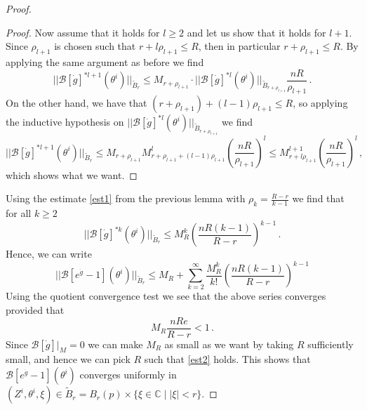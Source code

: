 \documentclass{article}
\theoremstyle{definition}
\numberwithin{equation}{section}
\begin{document}
\begin{proof}
\begin{proof}
    Now assume that it holds for $l \geq 2$ and let us show that it holds for $l+1$. Since $\rho_{l+1}$ is chosen such that $r+l\rho_{l+1}\leq R$, then in particular $r+\rho_{l+1}\leq R$. By applying the same argument as before we find 
    \begin{equation*}
        ||\mathcal{B}[\dot{g}]^{*l+1}(\theta^i)||_{\widetilde{B}_r}\leq M_{r+\rho_{l+1}}\cdot  ||\mathcal{B}[\dot{g}]^{*l}(\theta^i)||_{\widetilde{B}_{r+\rho_{l+1}}}\frac{nR}{\rho_{l+1}}\,.
    \end{equation*}
    On the other hand, we have that $(r+\rho_{l+1})+(l-1)\rho_{l+1}\leq R$, so applying the inductive hypothesis on $||\mathcal{B}[\dot{g}]^{*l}(\theta^i)||_{\widetilde{B}_{r+\rho_{l+1}}}$ we find
    \begin{equation*}
        ||\mathcal{B}[\dot{g}]^{*l+1}(\theta^i)||_{\widetilde{B}_r}\leq M_{r+\rho_{l+1}}M_{r+\rho_{l+1}+(l-1)\rho_{l+1}}^l\left(\frac{nR}{\rho_{l+1}}\right)^{l}\leq M_{r+l\rho_{l+1}}^{l+1}\left(\frac{nR}{\rho_{l+1}}\right)^{l}\,,
    \end{equation*}
    which shows what we want. 
    \end{proof}
    Using the estimate \eqref{est1} from the previous lemma with $\rho_k=\frac{R-r}{k-1}$ we find that for all $k\geq 2$
    \begin{equation*}
        ||\mathcal{B}[\dot{g}]^{*k}(\theta^i)||_{\widetilde{B}_{r}}\leq M_{R}^k \left(\frac{nR(k-1)}{R-r}\right)^{k-1}\,.
    \end{equation*}
    Hence, we can write
    \begin{equation*}
        ||\mathcal{B}[e^{\dot{g}}-1](\theta^i)||_{\widetilde{B}_r}\leq M_R+ \sum_{k=2}^{\infty}\frac{M_{R}^k }{k!}\left(\frac{nR(k-1)}{R-r}\right)^{k-1}
    \end{equation*}
    Using the quotient convergence test we see that the above series converges provided that 
    \begin{equation}\label{est2}
        M_R\frac{nRe}{R-r}<1\,.
    \end{equation}
    Since $\mathcal{B}[\dot{g}]|_M=0$ we can make $M_R$ as small as we want by taking $R$ sufficiently small, and hence we can pick $R$ such that \eqref{est2} holds. This shows that $\mathcal{B}[e^{\dot{g}}-1](\theta^i)$ converges uniformly in $(Z^i,\theta^i,\xi)\in \widetilde{B}_r=B_r(p)\times \{\xi \in \mathbb{C} \; | \; |\xi|<r\}$.
\end{proof}
\end{document}
